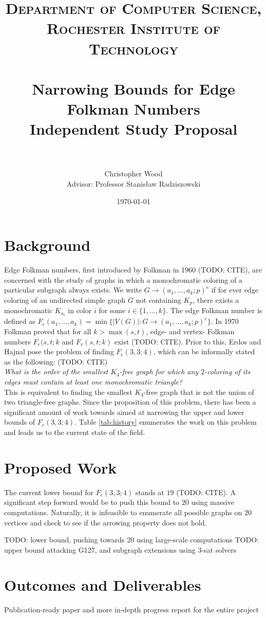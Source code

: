 \documentclass[paper=a4, fontsize=11pt]{scrartcl} %
\title{	
\normalfont \normalsize 
\textsc{Department of Computer Science, Rochester Institute of Technology} \\ [25pt] %
\horrule{2pt} \\[0.4cm] %
\huge Narrowing Bounds for Edge Folkman Numbers \\ 
\Large Independent Study Proposal \\
\horrule{2pt} \\[0.5cm] %
}
\author{Christopher Wood \\ Advisor: Professor Stanis{\l}aw Radziszowski} %
\date{\normalsize\today} %
\numberwithin{equation}{section} %
\numberwithin{figure}{section} %
\numberwithin{table}{section} %
\begin{document}
\maketitle %


\section{Background}
Edge Folkman numbers, first introduced by Folkman in 1960 (TODO: CITE), are concerned
with the study of graphs in which a monochromatic coloring of a particular subgraph always exists. 
We write $G \to (a_1, ..., a_k; p)^e$ if for ever edge coloring of an undirected simple graph $G$ not 
containing $K_p$, there exists a monochromatic $K_{a_{i}}$ in color $i$ for some $i \in \{1, ..., k\}$. 
The edge Folkman number is defined as $F_e(a_1, ..., a_k) = \min\{|V(G)| : G \to (a_1, ..., a_k; p)^e\}$.
In 1970 Folkman proved that for all $k > \max(s,t)$, edge- and vertex- Folkman numbers $F_e(s,t;k$
and $F_v(s,t;k)$ exist (TODO: CITE). Prior to this, Erdos and Hajnal pose the problem of finding $F_e(3,3;4)$, which
can be informally stated as the following: (TODO: CITE) \\

\noindent \emph{What is the order of the smallest $K_4$-free graph for which any $2$-coloring of its edges must contain at least one 
monochromatic triangle?}\\

This is equivalent to finding the smallest $K_4$-free graph that is not the union of two 
triangle-free graphs. Since the proposition of this problem, there has been a significant
amount of work towards aimed at narrowing the upper and lower bounds of $F_e(3,3;4)$. 
Table \ref{tab:history} enumerates the work on this problem and leads us to the 
current state of the field.


\section{Proposed Work}
The current lower bound for $F_e(3,3;4)$ stands at $19$ (TODO: CITE). A significant step
forward would be to push this bound to $20$ using massive computations. Naturally, it is 
infeasible to enumerate all possible graphs on $20$ vertices and check to see if the arrowing 
property does not hold. 

TODO: lower bound, pushing towards 20 using large-scale computations
TODO: upper bound attacking G127, and subgraph extensions using 3-sat solvers

\section{Outcomes and Deliverables}
Publication-ready paper and more in-depth progress report for the entire project
\end{document}
